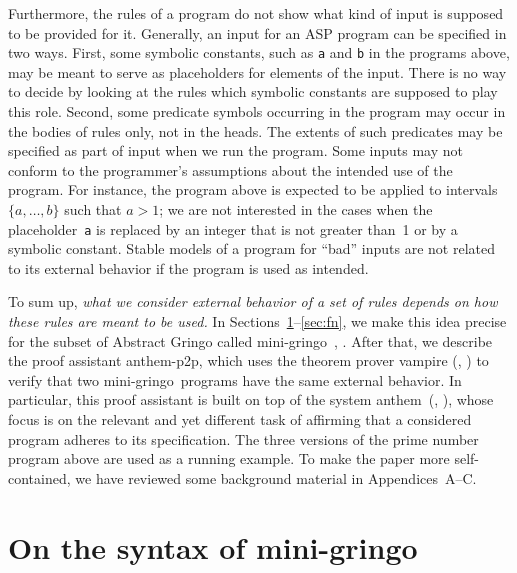 \documentclass{tlp}
\def\citeb#1{(\citeauthor{#1}, \citeyear{#1})}
\def\gringo{{\sc gringo}}
\def\anthem{{\sc anthem}}
\def\vampire{{\sc vampire}}
\begin{document}
Furthermore, the rules of a program do not show what kind of input is
supposed to be provided for it.
Generally, an input for an ASP program can be specified in two ways.
First, some symbolic constants, such as {\tt a} and {\tt b} in the
programs above, may be meant to serve as placeholders for elements of
the input.
There is no way to decide by looking at the rules
which symbolic constants are supposed to play this role.
Second, some predicate symbols occurring in the program may occur in
the bodies of rules only, not in the heads.  The extents of such
predicates may be specified as part of input when we run the program.
Some inputs may not conform to the programmer's assumptions about
the intended use of the program.  For instance, the program above is
expected to be applied to intervals $\{a,\dots,b\}$ such that $a>1$;
we are not interested in the cases when the placeholder~{\tt a} is
replaced by an integer that is not greater than~1 or by a symbolic constant.
Stable models of a program for ``bad'' inputs are not related to its
external behavior if the program is used as intended.

To sum up, \emph{what we consider external behavior of a set of rules
depends on how these rules are meant to be used.}
In Sections~\ref{sec:mg}--\ref{sec:fn},
we make this idea precise for the subset of
Abstract Gringo called mini-\gringo\ \cite[Section~2]{fan20},
\cite[Section~2.1]{fan22}.   After that, we
describe the proof assistant {\sc anthem-p2p}, which uses
the theorem prover \hbox{\vampire} \citeb{vor13}
 to verify that two mini-\gringo\ programs have the
 same external behavior.  
 In particular, this proof assistant is built on top of the system
 \anthem\ \citeb{fan20}, whose focus is on the relevant and yet different task of affirming that a considered program adheres to its specification.
 The three versions of the prime number program
 above are used as a running example.  To make the paper more
 self-contained, we have reviewed some background material in
 Appendices~A--C.

\section{On the syntax of mini-\gringo}\label{sec:mg}
\end{document}
